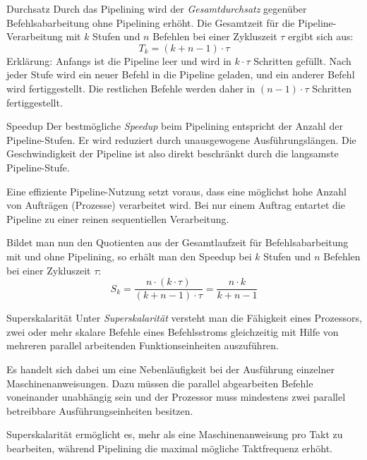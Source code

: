 \begin{defi}[Pipelining]{Durchsatz}
    Durch das Pipelining wird der \emph{Gesamtdurchsatz} gegenüber Befehlsabarbeitung ohne Pipelining erhöht.
    Die Gesamtzeit für die Pipeline-Verarbeitung mit $k$ Stufen und $n$ Befehlen bei einer Zykluszeit $\tau$ ergibt sich aus:
    \[
        T_k = (k + n - 1) \cdot \tau
    \]
    Erklärung: Anfangs ist die Pipeline leer und wird in $k \cdot \tau$ Schritten gefüllt.
    Nach jeder Stufe wird ein neuer Befehl in die Pipeline geladen, und ein anderer Befehl wird fertiggestellt.
    Die restlichen Befehle werden daher in $(n-1)\cdot \tau$ Schritten fertiggestellt.
\end{defi}

\begin{defi}[Pipelining]{Speedup}
    Der bestmögliche \emph{Speedup} beim Pipelining entspricht der Anzahl der Pipeline-Stufen.
    Er wird reduziert durch unausgewogene Ausführungslängen.
    Die Geschwindigkeit der Pipeline ist also direkt beschränkt durch die langsamste Pipeline-Stufe.

    Eine effiziente Pipeline-Nutzung setzt voraus, dass eine möglichst hohe Anzahl von Aufträgen (Prozesse) verarbeitet wird.
    Bei nur einem Auftrag entartet die Pipeline zu einer reinen sequentiellen Verarbeitung.

    Bildet man nun den Quotienten aus der Gesamtlaufzeit für Befehlsabarbeitung mit und ohne Pipelining, so erhält man den Speedup bei $k$ Stufen und $n$ Befehlen bei einer Zykluszeit $\tau$:
    \[
        S_k = \frac{n \cdot (k \cdot \tau)}{(k + n - 1) \cdot \tau} = \frac{n \cdot k}{k + n - 1}
    \]
\end{defi}

\begin{defi}{Superskalarität}
    Unter \emph{Superskalarität} versteht man die Fähigkeit eines Prozessors, zwei oder mehr skalare Befehle eines Befehlsstroms gleichzeitig mit Hilfe von mehreren parallel arbeitenden Funktionseinheiten auszuführen.

    Es handelt sich dabei um eine Nebenläufigkeit bei der Ausführung einzelner Maschinenanweisungen.
    Dazu müssen die parallel abgearbeiten Befehle voneinander unabhängig sein und der Prozessor muss mindestens zwei parallel betreibbare Ausführungseinheiten besitzen.

    Superskalarität ermöglicht es, mehr als eine Maschinenanweisung pro Takt zu bearbeiten, während Pipelining die maximal mögliche Taktfrequenz erhöht.
\end{defi}

